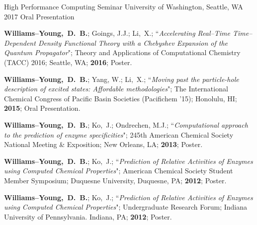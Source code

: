\documentclass[10pt]{res} %
\newcommand*\me[0]{{\bf Williams--Young,~D.~B.}}
\newcommand*\xsli[0]{Li,~X.}
\newcommand*\ko[0]{Ko,~J.}
\newcommand{\presentation}[6]{%
{#1}; ``\emph{#2}"; {#3}; {#4}; \textbf{#5}; {#6}.%
}
\begin{document}
\begin{resume}
\begin{etaremune}
        {High Performance Computing Seminar}%
        {University of Washington, Seattle, WA}%
        {2017}%
        {Oral Presentation} 
  \item \presentation%
        {\me; Goings, J.J.; \xsli}%
        {Accelerating Real--Time Time--Dependent Density Functional Theory with a Chebyshev Expansion of the Quantum Propagator}%
        {Theory and Applications of Computational Chemistry (TACC) 2016}%
        {Seattle, WA}%
        {2016}%
        {Poster} 
  \item \presentation%
        {\me; Yang, W.; \xsli}%
        {Moving past the particle-hole description of excited states: Affordable methodologies}%
        {The International Chemical Congress of Pacific Basin Societies (Pacifichem '15)}%
        {Honolulu, HI}%
        {2015}%
        {Oral Presentation} 
  \item \presentation%
        {\me; \ko; Ondrechen, M.J.}%
        {Computational approach to the prediction of enzyme specificities}%
        {245th American Chemical Society National Meeting \& Exposition}%
        {New Orleans, LA}%
        {2013}%
        {Poster} 
  \item \presentation%
        {\me; \ko}%
        {Prediction of Relative Activities of Enzymes using Computed Chemical Properties}%
        {American Chemical Society Student Member Symposium}%
        {Duquesne University, Duquesne, PA}%
        {2012}%
        {Poster} 
  \item \presentation%
        {\me; \ko}%
        {Prediction of Relative Activities of Enzymes using Computed Chemical Properties}%
        {Undergraduate Research Forum}%
        {Indiana University of Pennsylvania. Indiana, PA}%
        {2012}%
        {Poster} 
\end{etaremune}


\end{resume}
\end{document}
